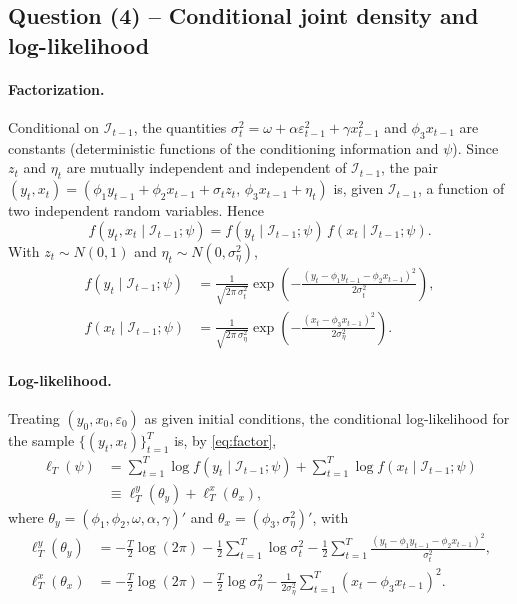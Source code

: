 \documentclass[12pt]{article}
\newcommand{\Info}{\mathcal{I}}
\begin{document}
\subsection*{Question (4) -- Conditional joint density and log-likelihood}\label{sec:p3-q4}

\paragraph{Factorization.} Conditional on $\Info_{t-1}$, the quantities $\sigma_t^2=\omega+\alpha\varepsilon_{t-1}^2+\gamma x_{t-1}^2$ and $\phi_3 x_{t-1}$ are constants (deterministic functions of the conditioning information and $\psi$). Since $z_t$ and $\eta_t$ are mutually independent and independent of $\Info_{t-1}$, the pair $(y_t,x_t)=(\phi_1 y_{t-1}+\phi_2 x_{t-1}+\sigma_t z_t,\,\phi_3 x_{t-1}+\eta_t)$ is, given $\Info_{t-1}$, a function of two independent random variables. Hence
\begin{equation}
f(y_t,x_t\mid\Info_{t-1};\psi) = f(y_t\mid\Info_{t-1};\psi)\,f(x_t\mid\Info_{t-1};\psi).\label{eq:factor}
\end{equation}
With $z_t\sim N(0,1)$ and $\eta_t\sim N(0,\sigma_\eta^2)$,
\begin{align}
f(y_t\mid\Info_{t-1};\psi)
&= \frac{1}{\sqrt{2\pi\,\sigma_t^2}}\exp\!\left(-\frac{(y_t-\phi_1 y_{t-1}-\phi_2 x_{t-1})^2}{2\sigma_t^2}\right),\label{eq:fy}\\
f(x_t\mid\Info_{t-1};\psi)
&= \frac{1}{\sqrt{2\pi\,\sigma_\eta^2}}\exp\!\left(-\frac{(x_t-\phi_3 x_{t-1})^2}{2\sigma_\eta^2}\right).\label{eq:fx}
\end{align}

\paragraph{Log-likelihood.} Treating $(y_0,x_0,\varepsilon_0)$ as given initial conditions, the conditional log-likelihood for the sample $\{(y_t,x_t)\}_{t=1}^{T}$ is, by \eqref{eq:factor},
\begin{align}
\ell_T(\psi)
&= \sum_{t=1}^{T}\log f(y_t\mid\Info_{t-1};\psi) + \sum_{t=1}^{T}\log f(x_t\mid\Info_{t-1};\psi)\nonumber\\
&\equiv \ell_T^{y}(\theta_y) + \ell_T^{x}(\theta_x),\label{eq:ll-split}
\end{align}
where $\theta_y=(\phi_1,\phi_2,\omega,\alpha,\gamma)'$ and $\theta_x=(\phi_3,\sigma_\eta^2)'$, with
\begin{align}
\ell_T^{y}(\theta_y) &= -\frac{T}{2}\log(2\pi) - \frac{1}{2}\sum_{t=1}^{T}\log\sigma_t^2 - \frac{1}{2}\sum_{t=1}^{T}\frac{(y_t-\phi_1 y_{t-1}-\phi_2 x_{t-1})^2}{\sigma_t^2},\label{eq:lly}\\
\ell_T^{x}(\theta_x) &= -\frac{T}{2}\log(2\pi) - \frac{T}{2}\log\sigma_\eta^2 - \frac{1}{2\sigma_\eta^2}\sum_{t=1}^{T}(x_t-\phi_3 x_{t-1})^2.\label{eq:llx}
\end{align}
\end{document}
